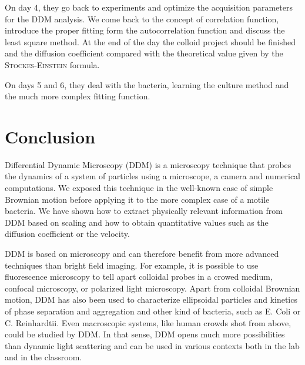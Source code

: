 \documentclass[prb,reprint,amsmath,amssymb]{revtex4-1}
\newcommand{\tg}[1]{{\color{magenta}#1}} %
\begin{document}
On day 4, they go back to experiments and optimize the acquisition parameters for the DDM analysis. We come back to the concept of correlation function, introduce the proper fitting form the autocorrelation function and discuss the least square method. At the end of the day the colloid project should be finished and the diffusion coefficient compared with the theoretical value given by the \textsc{Stockes-Einstein} formula.

On days 5 and 6, they deal with the bacteria, learning the culture method and the much more complex fitting function. 





\section{\label{sec:cl}Conclusion}

Differential Dynamic Microscopy (DDM) is a microscopy technique that probes the dynamics of a system of particles using a microscope, a camera and numerical computations. We exposed this technique in the well-known case of simple Brownian motion before applying it to the more complex case of a motile bacteria. We have shown how to extract physically relevant information from DDM based on scaling and how to obtain quantitative values such as the diffusion coefficient or the velocity.

DDM is based  on microscopy and can therefore benefit from  more advanced techniques than bright field imaging. For example, it is possible to use fluorescence microscopy to tell apart colloidal probes in a crowed medium\cite{Hendricks2015}, confocal microscopy\cite{Lu2012}, or polarized light microscopy\citep{20_reufer2012differential}. Apart from colloidal Brownian motion, DDM has also been used to characterize ellipsoidal particles\citep{20_reufer2012differential} and kinetics of phase separation\cite{Gao2015} and aggregation\cite{Ferri2011} \tg{and other kind of bacteria, such as E. Coli or C. Reinhardtii\cite{4_Martinez20121637}}. Even macroscopic systems, like human crowds shot from above, could be studied by DDM. In that sense, DDM opens much more possibilities than dynamic light scattering and can be used in various contexts both in the lab and in the classroom.
\end{document}

